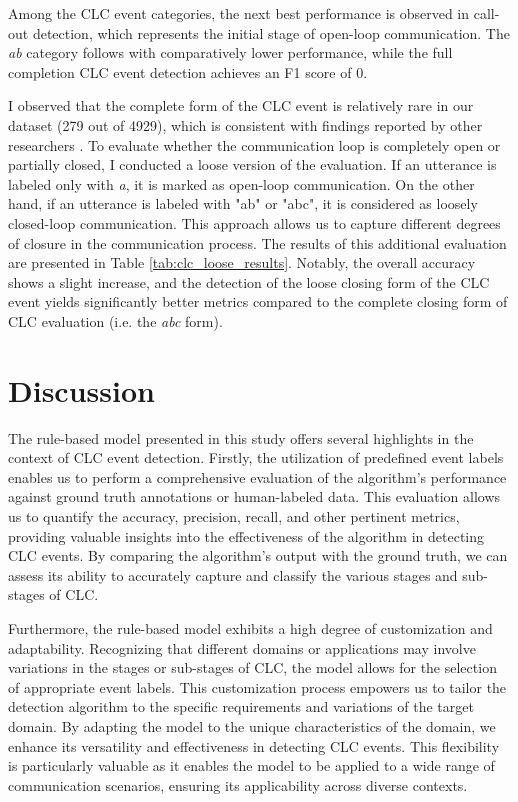 \documentclass[11pt]{article}
\begin{document}
Among the CLC event categories, the next best performance is observed in call-out detection, which represents the initial stage of open-loop communication. The \textit{ab} category follows with comparatively lower performance, while the full completion CLC event detection achieves an F1 score of 0.

I observed that the complete form of the CLC event is relatively rare in our dataset (279 out of 4929), which is consistent with findings reported by other researchers \citep{hargestam2016trauma, marzuki2019closed}. To evaluate whether the communication loop is completely open or partially closed, I conducted a loose version of the evaluation. If an utterance is labeled only with \textit{a}, it is marked as open-loop communication. On the other hand, if an utterance is labeled with "ab" or "abc", it is considered as loosely closed-loop communication. This approach allows us to capture different degrees of closure in the communication process. The results of this additional evaluation are presented in Table \ref{tab:clc_loose_results}. Notably, the overall accuracy shows a slight increase, and the detection of the loose closing form of the CLC event yields significantly better metrics compared to the complete closing form of CLC evaluation (i.e. the \textit{abc} form).

\section{Discussion}

The rule-based model presented in this study offers several highlights in the context of CLC event detection. Firstly, the utilization of predefined event labels enables us to perform a comprehensive evaluation of the algorithm's performance against ground truth annotations or human-labeled data. This evaluation allows us to quantify the accuracy, precision, recall, and other pertinent metrics, providing valuable insights into the effectiveness of the algorithm in detecting CLC events. By comparing the algorithm's output with the ground truth, we can assess its ability to accurately capture and classify the various stages and sub-stages of CLC.

Furthermore, the rule-based model exhibits a high degree of customization and adaptability. Recognizing that different domains or applications may involve variations in the stages or sub-stages of CLC, the model allows for the selection of appropriate event labels. This customization process empowers us to tailor the detection algorithm to the specific requirements and variations of the target domain. By adapting the model to the unique characteristics of the domain, we enhance its versatility and effectiveness in detecting CLC events. This flexibility is particularly valuable as it enables the model to be applied to a wide range of communication scenarios, ensuring its applicability across diverse contexts.
\end{document}
